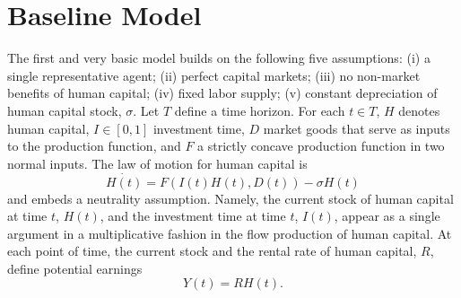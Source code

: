 \section{Baseline Model}
\noindent The first and very basic model builds on the following five assumptions: (i) a single representative agent; (ii) perfect capital markets; (iii) no non-market benefits of human capital; (iv) fixed labor supply; (v) constant depreciation of human capital stock, $\sigma$. Let $T$ define a time horizon. For each $t \in T$, $H$ denotes human capital, $I \in [0,1]$ investment time, $D$ market goods that serve as inputs to the production function, and $F$ a strictly concave production function in two normal inputs. The law of motion for human capital is
\begin{equation}
\dot{H(t)} = F \left( I(t) H(t), D(t) \right) - \sigma H(t)
\end{equation}
and embeds a neutrality assumption. Namely, the current stock of human capital at time $t$, $H(t)$, and the investment time at time $t$, $I(t)$, appear as a single argument in a multiplicative fashion in the flow production of human capital. At each point of time, the current stock and the rental rate of human capital, $R$, define potential earnings
\begin{equation}
Y(t) = R H(t).
\end{equation}

